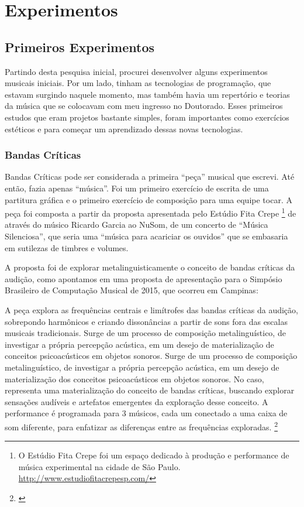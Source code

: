

\chapter{Experimentos}
\label{ch:tony}


\section{Primeiros Experimentos}
Partindo desta pesquisa inicial, procurei desenvolver alguns experimentos musicais iniciais.  Por um lado, tinham as tecnologias de programação, que estavam surgindo naquele momento, mas também havia um repertório e teorias da música que se colocavam com meu ingresso no Doutorado. Esses primeiros estudos que eram projetos bastante simples, foram importantes como exercícios estéticos e para começar um aprendizado dessas novas tecnologias.


\subsection{Bandas Críticas}
Bandas Críticas pode ser considerada a primeira ``peça'' musical que escrevi. Até então, fazia apenas ``música''. Foi um primeiro exercício de escrita de uma partitura gráfica e o primeiro exercício de composição para uma equipe tocar. A peça foi composta a partir da proposta apresentada pelo Estúdio Fita Crepe \footnote{O Estúdio Fita Crepe foi um espaço dedicado à produção e performance de música experimental na cidade de São Paulo. \url{http://www.estudiofitacrepesp.com/}} de através do músico Ricardo Garcia ao NuSom, de um concerto de ``Música Silenciosa'', que seria uma ``música para acariciar os ouvidos'' que se embasaria em sutilezas de timbres e volumes.

A proposta foi de explorar metalinguisticamente o conceito de bandas críticas da audição, como apontamos em uma proposta de apresentação para o Simpósio Brasileiro de Computação Musical de 2015, que ocorreu em Campinas:


\begin{citacao}
A peça explora as frequências centrais e limítrofes das bandas críticas da audição, sobrepondo harmônicos e criando dissonâncias a partir de sons fora das escalas musicais tradicionais. Surge de um processo de composição metalinguístico, de investigar a própria percepção acústica, em um desejo de materialização de conceitos psicoacústicos em objetos sonoros. 
Surge de um processo de composição metalinguístico, de investigar a própria percepção acústica, em um desejo de materialização dos conceitos psicoacústicos em objetos sonoros. No caso, representa uma materialização do conceito de bandas críticas, buscando explorar sensações audíveis e artefatos emergentes da exploração desse conceito. A performance é programada para 3 músicos, cada um conectado a uma caixa de som diferente, para enfatizar as diferenças entre as frequências exploradas. \footnote{\cite{ArianeStolfi2015}}
\end{citacao}

